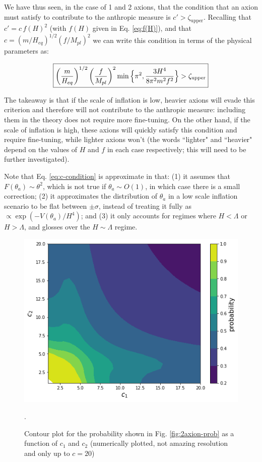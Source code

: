 \documentclass[11pt]{article}
\begin{document}
We have thus seen, in the case of 1 and 2 axions, that the condition that an axion must satisfy to contribute to the anthropic measure is $c'>\zeta_\text{upper}$. Recalling that $c'=c\,f(H)^2$ (with $f(H)$ given in Eq. \eqref{eq:f(H)}), and that $c=(m/H_{eq})^{1/2}(f/M_{pl})^2$ we can write this condition in terms of the physical parameters as:

\begin{equation}
    \label{eq:c-condition}
    \boxed{\left(\frac{m}{H_{eq}}\right)^{1/2}\left(\frac{f}{M_{pl}}\right)^{2}\min{ \Bigl\{ \pi^2,\frac{3H^4}{8\pi^2m^2f^2}\Bigr\}}>\zeta_\text{upper}}
\end{equation}

The takeaway is that if the scale of inflation is low, heavier axions will evade this criterion and therefore will not contribute to the anthropic measure: including them in the theory does not require more fine-tuning. On the other hand, if the scale of inflation is high, these axions will quickly satisfy this condition and require fine-tuning, while lighter axions won't (the words ``lighter" and ``heavier" depend on the values of $H$ and $f$ in each case respectively; this will need to be further investigated).

Note that Eq. \eqref{eq:c-condition} is approximate in that: (1) it assumes that $F(\theta_a)\sim\theta^2$, which is not true if $\theta_a \sim O(1)$, in which case there is a small correction; (2) it approximates the distribution of $\theta_a$ in a low scale inflation scenario to be flat between $\pm \sigma$, instead of treating it fully as $\propto \exp{\left(-V(\theta_a)/H^4\right)}$; and (3) it only accounts for regimes where $H<\Lambda$ or $H>\Lambda$, and glosses over the $H\sim\Lambda$ regime.

\begin{figure}[h]
    \includegraphics[scale=0.6]{figs/2axion-contour.png}
    \centering
    \caption{Contour plot for the probability shown in Fig. \ref{fig:2axion-prob} as a function of $c_1$ and $c_2$ (numerically plotted, not amazing resolution and only up to $c=20$)}.
    \label{fig:2axion-contour}
\end{figure}
\end{document}
